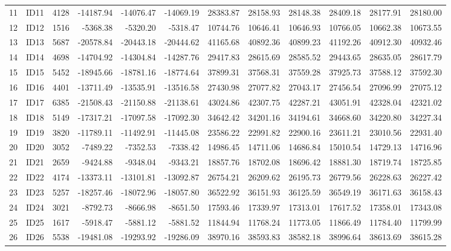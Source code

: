 \documentclass[12pt]{article}\usepackage[]{graphicx}\usepackage[]{color}
\begin{document}
\begin{table}[ht]
{\begin{tabular}{rlrrrrrrrrrr}
  11 & ID11 & 4128 & -14187.94 & -14076.47 & -14069.19 & 28383.87 & 28158.93 & 28148.38 & 28409.18 & 28177.91 & 28180.00 \\ 
  12 & ID12 & 1516 & -5368.38 & -5320.20 & -5318.47 & 10744.76 & 10646.41 & 10646.93 & 10766.05 & 10662.38 & 10673.55 \\ 
  13 & ID13 & 5687 & -20578.84 & -20443.18 & -20444.62 & 41165.68 & 40892.36 & 40899.23 & 41192.26 & 40912.30 & 40932.46 \\ 
  14 & ID14 & 4698 & -14704.92 & -14304.84 & -14287.76 & 29417.83 & 28615.69 & 28585.52 & 29443.65 & 28635.05 & 28617.79 \\ 
  15 & ID15 & 5452 & -18945.66 & -18781.16 & -18774.64 & 37899.31 & 37568.31 & 37559.28 & 37925.73 & 37588.12 & 37592.30 \\ 
  16 & ID16 & 4401 & -13711.49 & -13535.91 & -13516.58 & 27430.98 & 27077.82 & 27043.17 & 27456.54 & 27096.99 & 27075.12 \\ 
  17 & ID17 & 6385 & -21508.43 & -21150.88 & -21138.61 & 43024.86 & 42307.75 & 42287.21 & 43051.91 & 42328.04 & 42321.02 \\ 
  18 & ID18 & 5149 & -17317.21 & -17097.58 & -17092.30 & 34642.42 & 34201.16 & 34194.61 & 34668.60 & 34220.80 & 34227.34 \\ 
  19 & ID19 & 3820 & -11789.11 & -11492.91 & -11445.08 & 23586.22 & 22991.82 & 22900.16 & 23611.21 & 23010.56 & 22931.40 \\ 
  20 & ID20 & 3052 & -7489.22 & -7352.53 & -7338.42 & 14986.45 & 14711.06 & 14686.84 & 15010.54 & 14729.13 & 14716.96 \\ 
  21 & ID21 & 2659 & -9424.88 & -9348.04 & -9343.21 & 18857.76 & 18702.08 & 18696.42 & 18881.30 & 18719.74 & 18725.85 \\ 
  22 & ID22 & 4174 & -13373.11 & -13101.81 & -13092.87 & 26754.21 & 26209.62 & 26195.73 & 26779.56 & 26228.63 & 26227.42 \\ 
  23 & ID23 & 5257 & -18257.46 & -18072.96 & -18057.80 & 36522.92 & 36151.93 & 36125.59 & 36549.19 & 36171.63 & 36158.43 \\ 
  24 & ID24 & 3021 & -8792.73 & -8666.98 & -8651.50 & 17593.46 & 17339.97 & 17313.01 & 17617.52 & 17358.01 & 17343.08 \\ 
  25 & ID25 & 1617 & -5918.47 & -5881.12 & -5881.52 & 11844.94 & 11768.24 & 11773.05 & 11866.49 & 11784.40 & 11799.99 \\ 
  26 & ID26 & 5538 & -19481.08 & -19293.92 & -19286.09 & 38970.16 & 38593.83 & 38582.18 & 38996.64 & 38613.69 & 38615.28 \\ 

\end{tabular}}
\end{table}
\end{document}
